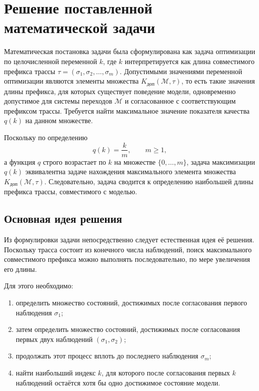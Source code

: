 \section{Решение поставленной математической задачи}

Математическая постановка задачи была сформулирована как
задача оптимизации по целочисленной переменной $k$, где $k$ интерпретируется
как длина совместимого префикса трассы
$\tau=(\sigma_1,\sigma_2,\dots,\sigma_m)$. Допустимыми значениями переменной
оптимизации являются элементы множества $K_{\mathrm{доп}}(\mathcal{M},\tau)$,
то есть такие значения длины префикса, для которых существует поведение модели,
одновременно допустимое для системы переходов $\mathcal{M}$ и согласованное с
соответствующим префиксом трассы. Требуется найти максимальное значение
показателя качества $q(k)$ на данном множестве.

Поскольку по определению
\[
q(k)=\frac{k}{m},
\qquad m \ge 1,
\]
а функция $q$ строго возрастает по $k$ на множестве $\{0,\dots,m\}$, задача
максимизации $q(k)$ эквивалентна задаче нахождения максимального элемента
множества $K_{\mathrm{доп}}(\mathcal{M},\tau)$. Следовательно, задача сводится
к определению наибольшей длины префикса трассы, совместимого с моделью.

\subsection{Основная идея решения}

Из формулировки задачи непосредственно следует естественная идея её решения.
Поскольку трасса состоит из конечного числа наблюдений, поиск максимального
совместимого префикса можно выполнять последовательно, по мере увеличения его
длины.

Для этого необходимо:
\begin{enumerate}
    \item определить множество состояний, достижимых после согласования первого
    наблюдения $\sigma_1$;
    \item затем определить множество состояний, достижимых после согласования
    первых двух наблюдений $(\sigma_1,\sigma_2)$;
    \item продолжать этот процесс вплоть до последнего наблюдения $\sigma_m$;
    \item найти наибольший индекс $k$, для которого после согласования первых
    $k$ наблюдений остаётся хотя бы одно достижимое состояние модели.
\end{enumerate}

